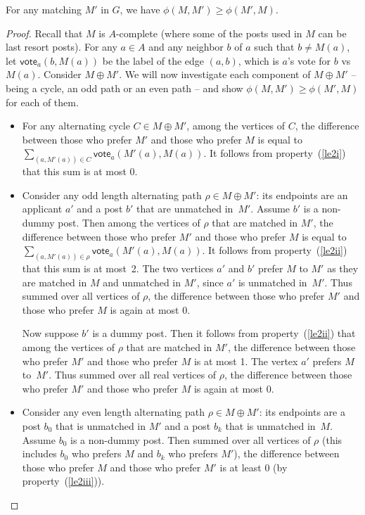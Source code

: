 \documentclass[11pt]{llncs}
\newcommand{\vote}{\mathsf{vote}}
\begin{document}
\begin{lemma}
\label{new-cor}
For any matching $M'$ in $G$, we have $\phi(M,M') \ge \phi(M',M)$.
\end{lemma}
\begin{proof}
Recall that $M$ is $A$-complete (where some of the posts used in $M$ 
can be last resort posts). For any $a \in A$ and any neighbor $b$ of $a$ such that $b \ne M(a)$, let $\vote_a(b,M(a))$ 
be the label of the edge $(a,b)$, which is $a$'s vote for $b$ vs~$M(a)$. Consider $M \oplus M'$. We will now investigate each component of $M \oplus M'$ -- being a cycle, an odd path or an even path -- and show $\phi(M,M') \ge \phi(M',M)$ for each of them.
\begin{itemize}
\item For any alternating cycle $C \in M \oplus M'$, among the vertices of $C$, the difference between those who prefer 
$M'$ and those who prefer $M$ is equal to $\sum_{(a,M'(a)) \in C}\vote_a(M'(a),M(a))$. It follows from property~(\ref{le2i}) 
that this sum is at most 0.

\item Consider any odd length alternating path $\rho \in M \oplus M'$: its endpoints are an applicant $a'$ and a post $b'$ that are 
unmatched in~$M'$. Assume $b'$ is a non-dummy post. Then among the vertices of $\rho$ that are matched in $M'$, the difference between 
those who prefer $M'$ and those who prefer $M$ is equal to $\sum_{(a,M'(a)) \in \rho}\vote_a(M'(a),M(a))$. It follows from 
property~(\ref{le2ii}) that this sum is at most~2. The two vertices $a'$ and $b'$ prefer $M$ to $M'$ as they are matched in $M$ and 
unmatched in $M'$, since $a'$ is unmatched in~$M'$. Thus summed over all vertices of $\rho$, the difference between those who prefer $M'$ and those who prefer $M$ is 
again at most 0.

Now suppose $b'$ is a dummy post. Then it follows from property~(\ref{le2ii}) that among the vertices of $\rho$ that are matched in 
$M'$, the difference between those who prefer $M'$ and those who prefer $M$ is at most 1. The vertex $a'$ prefers $M$ to~$M'$. Thus 
summed over all real vertices of $\rho$, the difference between those who prefer $M'$ and those who prefer $M$ is again at most 0.

\item Consider any even length alternating path $\rho \in M \oplus M'$: its endpoints are a post $b_0$ that is unmatched in $M'$ 
and a post $b_k$ that is unmatched in~$M$. Assume $b_0$ is a non-dummy post. Then summed over all vertices of $\rho$ 
(this includes $b_0$ who prefers $M$ and $b_k$ who prefers $M'$), the difference between those who prefer $M$ and those who prefer $M'$ 
is at least 0 (by property~(\ref{le2iii})). 


\end{itemize}
\end{proof}
\end{document}
